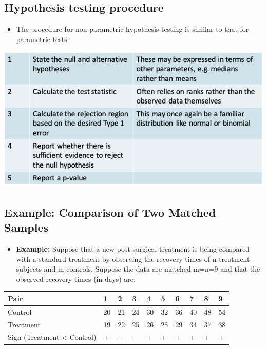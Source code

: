\documentclass[
]{book}
\providecommand{\tightlist}{%
  \setlength{\itemsep}{0pt}\setlength{\parskip}{0pt}}
\begin{document}
\hypertarget{hypothesis-testing-procedure}{%
\subsection{Hypothesis testing procedure}\label{hypothesis-testing-procedure}}

\begin{itemize}
\tightlist
\item
  The procedure for non-parametric hypothesis testing is similar to that for parametric tests
\end{itemize}

\includegraphics[width=1\linewidth]{./9_7}

\hypertarget{example-comparison-of-two-matched-samples}{%
\subsection{Example: Comparison of Two Matched Samples}\label{example-comparison-of-two-matched-samples}}

\begin{itemize}
\tightlist
\item
  \textbf{Example:} Suppose that a new post-surgical treatment is being compared with a standard treatment by observing the recovery times of n treatment subjects and m controls. Suppose the data are matched m=n=9 and that the observed recovery times (in days) are:
\end{itemize}

\begin{tabular}{l|l|l|l|l|l|l|l|l|l}
\hline
Pair &  1 &  2 &  3 &  4 &  5 &  6 &  7 &  8 &  9\\
\hline
Control & 20 & 21 & 24 & 30 & 32 & 36 & 40 & 48 & 54\\
\hline
Treatment & 19 & 22 & 25 & 26 & 28 & 29 & 34 & 37 & 38\\
\hline
Sign (Treatment < Control) & + & - & - & + & + & + & + & + & +\\
\hline
\end{tabular}
\end{document}
